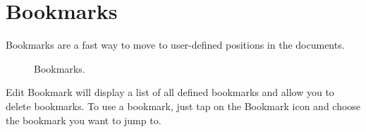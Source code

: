 \section{Bookmarks}\label{sec:Bookmark}

Bookmarks are a fast way to move to user-defined positions in the 
documents.\\

\begin{figure} [!htb]
\centerline{}
\caption{\label{fig:Bookmarks}Bookmarks.}
\end{figure}

Edit Bookmark will display a list of all defined bookmarks and 
allow you to delete bookmarks. To use a bookmark, just tap on the 
Bookmark icon and choose the bookmark you want to jump to.

